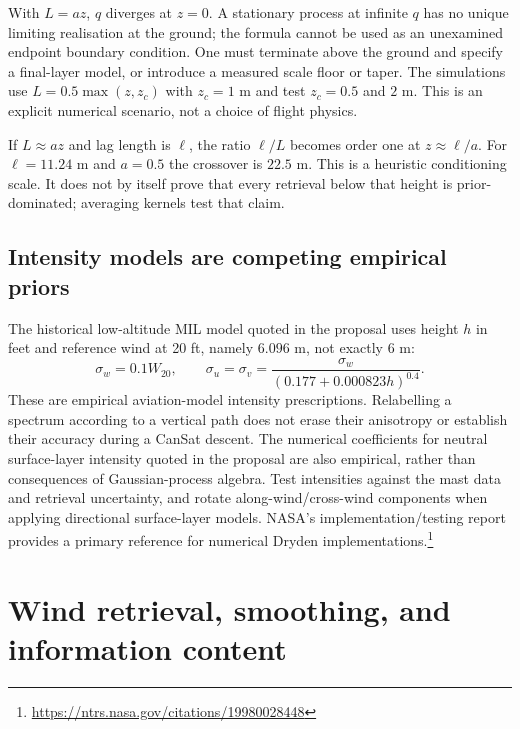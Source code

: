 With $L=az$, $q$ diverges at $z=0$. A stationary process at infinite $q$ has no unique limiting realisation at the ground; the formula cannot be used as an unexamined endpoint boundary condition. One must terminate above the ground and specify a final-layer model, or introduce a measured scale floor or taper. The simulations use $L=0.5\max(z,z_c)$ with $z_c=1$ m and test $z_c=0.5$ and $2$ m. This is an explicit numerical scenario, not a choice of flight physics.

If $L\approx az$ and lag length is $\ell$, the ratio $\ell/L$ becomes order one at $z\approx\ell/a$. For $\ell=11.24$ m and $a=0.5$ the crossover is $22.5$ m. This is a heuristic conditioning scale. It does not by itself prove that every retrieval below that height is prior-dominated; averaging kernels test that claim.

\subsection{Intensity models are competing empirical priors}
The historical low-altitude MIL model quoted in the proposal uses height $h$ in feet and reference wind at 20 ft, namely $6.096$ m, not exactly $6$ m:
\begin{equation}
 \sigma_w=0.1W_{20},\qquad
 \sigma_u=\sigma_v=\frac{\sigma_w}{(0.177+0.000823h)^{0.4}}.
\end{equation}
These are empirical aviation-model intensity prescriptions. Relabelling a spectrum according to a vertical path does not erase their anisotropy or establish their accuracy during a CanSat descent. The numerical coefficients for neutral surface-layer intensity quoted in the proposal are also empirical, rather than consequences of Gaussian-process algebra. Test intensities against the mast data and retrieval uncertainty, and rotate along-wind/cross-wind components when applying directional surface-layer models. NASA's implementation/testing report provides a primary reference for numerical Dryden implementations.\footnote{\url{https://ntrs.nasa.gov/citations/19980028448}}

\section{Wind retrieval, smoothing, and information content}
\label{sec:retrieval}


